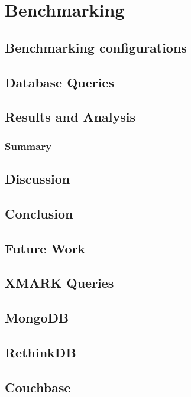 \documentclass[a4paper,12pt]{book}
\begin{document}
	\chapter{Benchmarking}\label{ch:benchmarking} %
	\section{Benchmarking configurations}
	
    \section{Database Queries}
        
    \section{Results and Analysis}
        
   \subsection{Summary}
	\section{Discussion}
	\section{Conclusion}\label{conc}
	
	\section{Future Work}\label{s.future}
	\begin{appendices}
	   	\chapter{XMARK Queries}\label{appendices-queries}
		\section{MongoDB}\label{mongodb-query-list}
			
		\section{RethinkDB}\label{rethinkdb-query-list}
				
		\section{Couchbase}\label{couchbase-query-list}
				
								
	\end{appendices}
\end{document}
